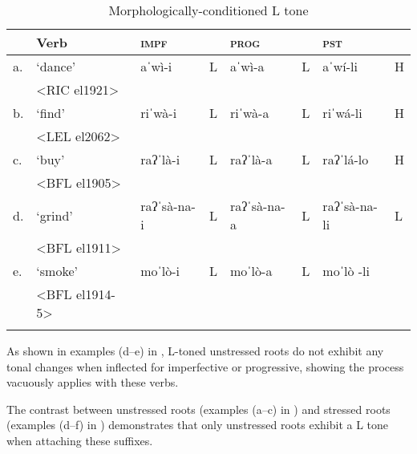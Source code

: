 \begin{table}
\caption{Morphologically-conditioned L tone}
\label{tab:morphologically-conditioned-tone}

\begin{tabularx}{\textwidth}{lQllllll}
\lsptoprule
&\textbf{Verb} & \textbf{\textsc{impf}}  & & \textbf{\textsc{prog}} &  & 	\textbf{\textsc{pst}} & \\
\midrule
a.& ‘dance’ & aˈwì-i	& L &   	aˈwì-a	& L  & 	aˈwí-li  &  H \\
&<RIC el1921>\\
b.& `find' & riˈwà-i & L &   riˈwà-a  & L &  	riˈwá-li &  	H	\\
&<LEL el2062>\\
c.& `buy' & raʔˈlà-i	&  L  &  	raʔˈlà-a	& L  &	raʔˈlá-lo & H	\\
&<BFL el1905>\\
d.& `grind' & raʔˈsà-na-i &	L	& raʔˈsà-na-a 	& L	& raʔˈsà-na-li 	& L\\
&<BFL el1911>\\
e.& `smoke' & moˈlò-i &	L	& moˈlò-a &	L	& moˈlò -li &  \\
&<BFL el1914-5>\\
\lspbottomrule
\end{tabularx}
\end{table}

As shown in examples (d--e) in , L-toned unstressed roots do not exhibit any tonal changes when inflected for imperfective or progressive, showing the process vacuously applies with these verbs.

The contrast between unstressed roots (examples (a--c) in ) and stressed roots (examples (d--f) in ) demonstrates that only unstressed roots exhibit a L tone when attaching these suffixes.


